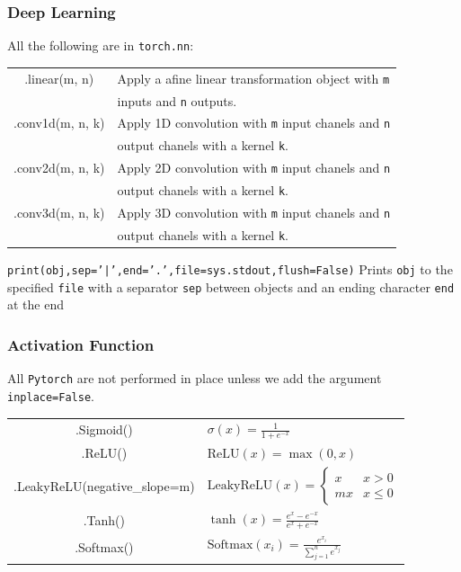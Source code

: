\documentclass[5pt]{article}
\begin{document}
\begin{multicols}{2}
\subsubsection{Deep Learning}
All the following are in \texttt{torch.nn}:\\
\begin{tabular}{C L}
.linear(m, n)     & Apply a afine linear transformation object with \texttt{m}\\
                  & inputs and \texttt{n} outputs.\\
.conv1d(m, n, k)  & Apply 1D convolution with \texttt{m} input chanels and \texttt{n}\\
                  & output chanels with a kernel \texttt{k}.\\
.conv2d(m, n, k)  & Apply 2D convolution with \texttt{m} input chanels and \texttt{n}\\
                  & output chanels with a kernel \texttt{k}.\\
.conv3d(m, n, k)  & Apply 3D convolution with \texttt{m} input chanels and \texttt{n}\\
                  & output chanels with a kernel \texttt{k}.\\
\end{tabular}
\texttt{print(obj,sep='|',end='.',file=sys.stdout,flush=False)}
Prints \texttt{obj} to the specified \texttt{file} with a separator \texttt{sep} between objects and an ending character \texttt{end} at the end

\subsubsection{Activation Function}
All \texttt{Pytorch} are not performed in place unless we add the argument \texttt{inplace=False}.\\
\begin{tabular}{C L}
.Sigmoid()                      & $\sigma(x)=\frac{1}{1+e^{-x}}$\\
.ReLU()                         & $\text{ReLU}(x)=\max(0,x)$\\
.LeakyReLU(negative\_slope=m)   & $\text{LeakyReLU}(x)=\begin{cases}x & x>0\\ mx & x\leq0 \end{cases}$\\
.Tanh()                         & $\tanh(x)=\frac{e^x-e^{-x}}{e^x+e^{-x}}$\\
.Softmax()                      & $\text{Softmax}(x_i)=\frac{e^{x_i}}{\sum^n_{j=1}e^{x_j}}$
\end{tabular}


\end{multicols}
\end{document}
